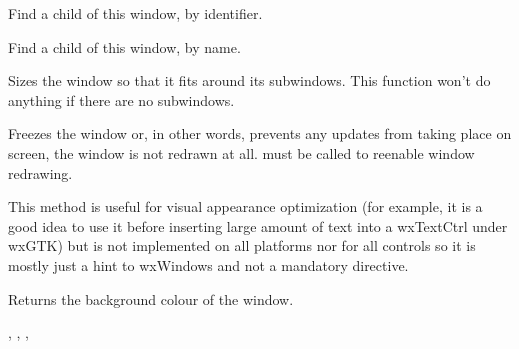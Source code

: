 
Find a child of this window, by identifier.


Find a child of this window, by name.


\label{wxwindowfit}


Sizes the window so that it fits around its subwindows. This function won't do
anything if there are no subwindows.

\label{wxwindowfreeze}


Freezes the window or, in other words, prevents any updates from taking place
on screen, the window is not redrawn at all.  must
be called to reenable window redrawing.

This method is useful for visual appearance optimization (for example, it
is a good idea to use it before inserting large amount of text into a
wxTextCtrl under wxGTK) but is not implemented on all platforms nor for all
controls so it is mostly just a hint to wxWindows and not a mandatory
directive.

\label{wxwindowgetbackgroundcolour}


Returns the background colour of the window.


,\rtfsp
{},\rtfsp
{},\rtfsp
{}

\label{wxwindowgetbestsize}

